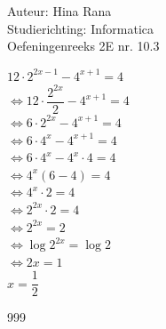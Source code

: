 \documentclass[a4paper]{article}
\begin{document}
\noindent \large Auteur: Hina Rana \\
\noindent \large Studierichting: Informatica\\
\noindent \large Oefeningenreeks 2E nr. 10.3\\

\medskip

\normalsize
$12 \cdot 2^{2x-1}-4^{x+1} = 4$\\

$\Leftrightarrow  12 \cdot \dfrac{2^{2x}}{2} - 4^{x+1} = 4$\\

$\Leftrightarrow  6 \cdot 2^{2x} -4^{x+1}= 4$\\

$\Leftrightarrow  6 \cdot 4^x - 4^{x+1} = 4$\\

$\Leftrightarrow  6 \cdot 4^x - 4^x \cdot 4 = 4$\\

$\Leftrightarrow  4^x(6-4)= 4$\\

$\Leftrightarrow  4^x \cdot 2 = 4$\\

$\Leftrightarrow  2^{2x} \cdot 2 = 4$\\

$\Leftrightarrow  2^{2x} = 2$\\

$\Leftrightarrow  \log 2^{2x} = \log 2$ \\

$\Leftrightarrow  2x = 1$\\

$ x = \dfrac{1}{2}$


\begin{thebibliography}{999}
\end{thebibliography}
\end{document}
